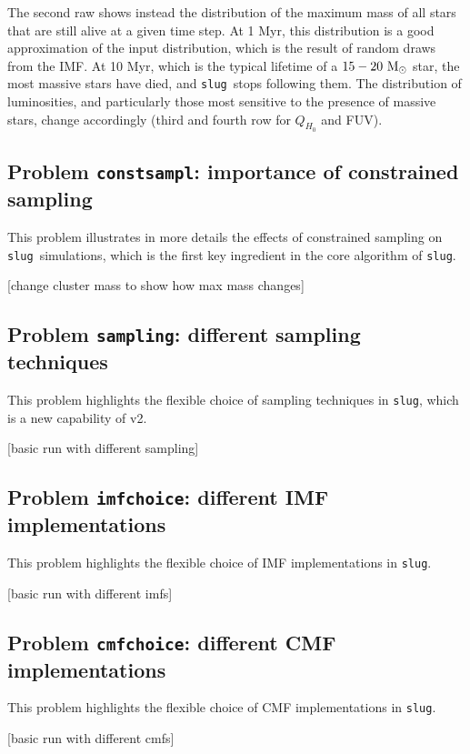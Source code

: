\documentclass[12pt]{article}
\newcommand{\slug}{\texttt{slug}}
\begin{document}
The second raw shows instead the distribution of the maximum mass of all stars that are still 
alive at a given time step. At 1 Myr, this distribution is a good approximation of the 
input distribution, which is the result of random draws from the IMF. At 10 Myr, which is the 
typical lifetime of a $15-20~\rm M_\odot$ star, the most massive stars have died, and 
\slug\ stops following them. The distribution of luminosities, and particularly those 
most sensitive to the presence of massive stars, change accordingly 
(third and fourth row for $Q_{H_0}$ and FUV).

\subsection{Problem {\tt constsampl}: importance of constrained sampling}

This problem illustrates in more details the effects of constrained sampling on \slug\ simulations, 
which is the first key ingredient in the core algorithm of \slug.

 


[change cluster mass to show how max mass changes]


\subsection{Problem {\tt sampling}: different sampling techniques}

This problem highlights the flexible choice of sampling techniques in \slug, which is 
a new capability of v2.

[basic run with different sampling]


\subsection{Problem {\tt imfchoice}: different IMF implementations}

This problem highlights the flexible choice of IMF implementations in \slug.

[basic run with different imfs]

\subsection{Problem {\tt cmfchoice}: different CMF implementations}

This problem highlights the flexible choice of CMF implementations in \slug.

[basic run with different cmfs]
\end{document}
